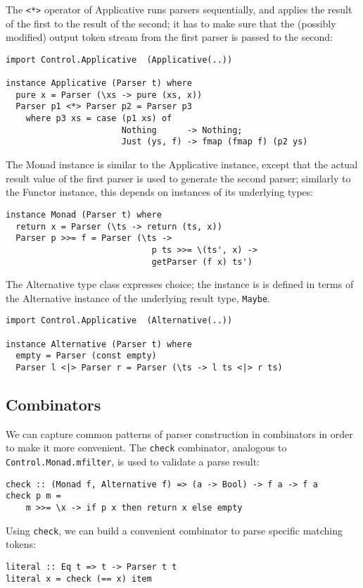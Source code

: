 \documentclass{tmr}
\begin{document}
The \verb+<*>+ operator of Applicative runs parsers sequentially, 
and applies the result of the first to the result of the second; it
has to make sure that the (possibly modified) output token stream from
the first parser is passed to the second:
\begin{verbatim}  
import Control.Applicative  (Applicative(..))

instance Applicative (Parser t) where
  pure x = Parser (\xs -> pure (xs, x))
  Parser p1 <*> Parser p2 = Parser p3
    where p3 xs = case (p1 xs) of
                       Nothing      -> Nothing;
                       Just (ys, f) -> fmap (fmap f) (p2 ys)
\end{verbatim}

The Monad instance is similar to the Applicative instance, except that 
the actual result value of the first parser is used to generate the 
second parser; similarly to the Functor instance, this depends on 
instances of its underlying types:
\begin{verbatim}
instance Monad (Parser t) where
  return x = Parser (\ts -> return (ts, x))
  Parser p >>= f = Parser (\ts ->
                             p ts >>= \(ts', x) ->
                             getParser (f x) ts')
\end{verbatim}

The Alternative type class expresses choice; the instance is
is defined in terms of the Alternative instance of the
underlying result type, \verb+Maybe+.
\begin{verbatim}
import Control.Applicative  (Alternative(..))

instance Alternative (Parser t) where
  empty = Parser (const empty)
  Parser l <|> Parser r = Parser (\ts -> l ts <|> r ts)
\end{verbatim}


\subsection{Combinators}
We can capture common patterns of parser construction in combinators in 
order to make it more convenient.  The \verb+check+ combinator, analogous 
to \verb+Control.Monad.mfilter+, is used to validate a parse result:
\begin{verbatim}
check :: (Monad f, Alternative f) => (a -> Bool) -> f a -> f a
check p m =
    m >>= \x -> if p x then return x else empty
\end{verbatim}

Using \verb+check+, we can build a convenient combinator to parse specific
matching tokens: 
\begin{verbatim}
literal :: Eq t => t -> Parser t t
literal x = check (== x) item
\end{verbatim}
\end{document}
